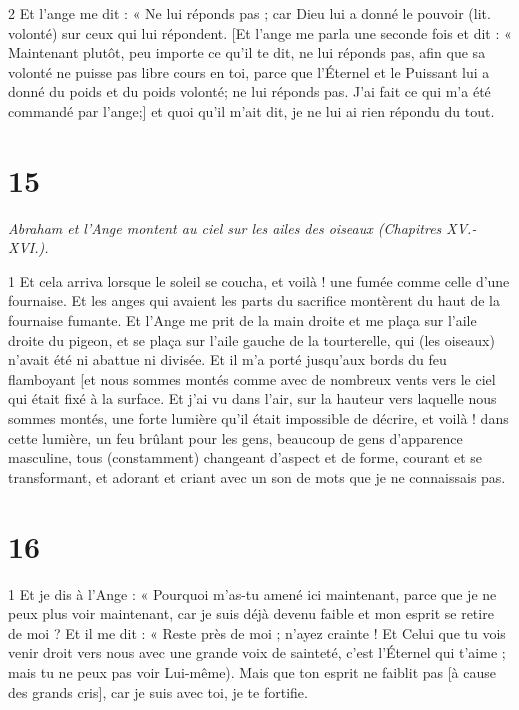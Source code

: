 \par 2 Et l'ange me dit : « Ne lui réponds pas ; car Dieu lui a donné le pouvoir (lit. volonté) sur ceux qui lui répondent. [Et l'ange me parla une seconde fois et dit : « Maintenant plutôt, peu importe ce qu'il te dit, ne lui réponds pas, afin que sa volonté ne puisse pas libre cours en toi, parce que l'Éternel et le Puissant lui a donné du poids et du poids volonté; ne lui réponds pas. J'ai fait ce qui m'a été commandé par l'ange;] et quoi qu'il m'ait dit, je ne lui ai rien répondu du tout.

\chapter{15}

\par \textit{Abraham et l'Ange montent au ciel sur les ailes des oiseaux (Chapitres XV.-XVI.).}

\par 1 Et cela arriva lorsque le soleil se coucha, et voilà ! une fumée comme celle d'une fournaise. Et les anges qui avaient les parts du sacrifice montèrent du haut de la fournaise fumante. Et l'Ange me prit de la main droite et me plaça sur l'aile droite du pigeon, et se plaça sur l'aile gauche de la tourterelle, qui (les oiseaux) n'avait été ni abattue ni divisée. Et il m'a porté jusqu'aux bords du feu flamboyant [et nous sommes montés comme avec de nombreux vents vers le ciel qui était fixé à la surface. Et j'ai vu dans l'air, sur la hauteur vers laquelle nous sommes montés, une forte lumière qu'il était impossible de décrire, et voilà ! dans cette lumière, un feu brûlant pour les gens, beaucoup de gens d'apparence masculine, tous (constamment) changeant d'aspect et de forme, courant et se transformant, et adorant et criant avec un son de mots que je ne connaissais pas.

\chapter{16}

\par 1 Et je dis à l'Ange : « Pourquoi m'as-tu amené ici maintenant, parce que je ne peux plus voir maintenant, car je suis déjà devenu faible et mon esprit se retire de moi ? Et il me dit : « Reste près de moi ; n'ayez crainte ! Et Celui que tu vois venir droit vers nous avec une grande voix de sainteté, c'est l'Éternel qui t'aime ; mais tu ne peux pas voir Lui-même). Mais que ton esprit ne faiblit pas [à cause des grands cris], car je suis avec toi, je te fortifie.

